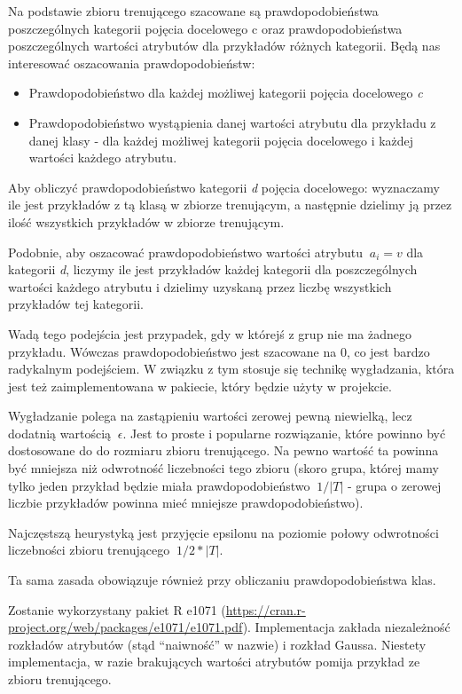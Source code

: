 \documentclass[11pt]{article} %
\begin{document}
Na podstawie zbioru trenującego szacowane są prawdopodobieństwa poszczególnych kategorii pojęcia docelowego c oraz prawdopodobieństwa poszczególnych wartości atrybutów dla przykładów różnych kategorii. Będą nas interesować oszacowania prawdopodobieństw:

\begin{itemize}
\item Prawdopodobieństwo dla każdej możliwej kategorii pojęcia docelowego \emph{c} 
\item Prawdopodobieństwo wystąpienia danej wartości atrybutu dla przykładu z danej klasy - dla każdej możliwej kategorii pojęcia docelowego i każdej wartości każdego atrybutu.
\end{itemize}

Aby obliczyć prawdopodobieństwo kategorii \emph{d} pojęcia docelowego: wyznaczamy ile jest przykładów z tą klasą w zbiorze trenującym, a następnie dzielimy ją przez ilość wszystkich przykładów w zbiorze trenującym.

Podobnie, aby oszacować prawdopodobieństwo wartości atrybutu $\ a_i=v $ dla kategorii \emph{d}, liczymy ile jest przykładów każdej kategorii dla poszczególnych wartości każdego atrybutu i dzielimy uzyskaną przez liczbę wszystkich przykładów tej kategorii.

Wadą tego podejścia jest przypadek, gdy w którejś z grup nie ma żadnego przykładu. Wówczas prawdopodobieństwo jest szacowane na 0, co jest bardzo radykalnym podejściem. W związku z tym stosuje się technikę wygładzania, która jest też zaimplementowana w pakiecie, który będzie użyty w projekcie. 

Wygładzanie polega na zastąpieniu wartości zerowej pewną niewielką, lecz dodatnią wartością $\ \epsilon $. Jest to proste i popularne rozwiązanie, które powinno być dostosowane do do rozmiaru zbioru trenującego. Na pewno wartość ta powinna być mniejsza niż odwrotność liczebności tego zbioru (skoro grupa, której mamy tylko jeden przykład będzie miała prawdopodobieństwo $\ 1/|T| $  - grupa o zerowej liczbie przykładów powinna mieć mniejsze prawdopodobieństwo).

Najczęstszą heurystyką jest przyjęcie epsilonu na poziomie połowy odwrotności liczebności zbioru trenującego $\ 1/2*|T| $.

Ta sama zasada obowiązuje również przy obliczaniu prawdopodobieństwa klas.

Zostanie wykorzystany pakiet R e1071 (\url{https://cran.r-project.org/web/packages/e1071/e1071.pdf}). Implementacja zakłada niezależność rozkładów atrybutów (stąd “naiwność” w nazwie) i rozkład Gaussa. Niestety implementacja, w razie brakujących wartości atrybutów pomija przykład ze zbioru trenującego.
\end{document}
